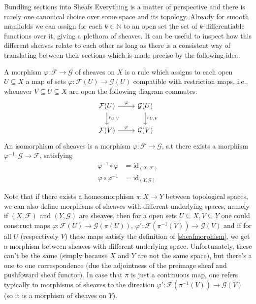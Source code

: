 \begin{subsection}{Bundling sections into Sheafs}
Everything is a matter of perspective and there is rarely one canonical choice over some space and its 
topology. Already for smooth manifolds we can assign for each \( k \in \mathbb{N} \) to an open set
the set of \( k \)-differentiable functions over it, giving a plethora of sheaves. It can be useful to inspect
how this different sheaves relate to each other as long as there is a consistent way of translating between their sections
which is made precise by the following idea.
\begin{definition} \label{sheafmorphism}
    A morphism \(\varphi : \mathcal{F} \to \mathcal{G}\) of sheaves on \(X\) is a rule which assigns to each open \(U \subseteq X\) 
    a map of sets \(\varphi : \mathcal{F}(U) \to \mathcal{G}(U)\) compatible with restriction maps, i.e., whenever \(V \subseteq U \subseteq X\) are open 
    the following diagram commutes: 
    \[
        \begin{tikzcd}
            \mathcal{F}(U) \arrow[r, "\varphi"] \arrow[d, "r_{U,V}"] & \mathcal{G}(U) \arrow[d, "r_{U,V}"] \\
            \mathcal{F}(V) \arrow[r, "\varphi"] & \mathcal{G}(V)
        \end{tikzcd}
    \]
    An isomorphism of sheaves is a morphism \( \varphi : \mathcal{F} \to \mathcal{G} \), s.t there exists a morphism 
    \( \varphi^{-1} : \mathcal{G} \to \mathcal{F} \), satisfying 
    \begin{align*}
        \varphi^{-1} \circ \varphi &= \text{id}_{(X, \mathcal{F})} \\
    \varphi \circ \varphi^{-1} &= \text{id}_{(Y, \mathcal{G})} 
    \end{align*}
\end{definition}
Note that if there exists a homeomorphism \( \pi : X \to Y \) between topological spaces, we can
also define morphisms of sheaves with different underlying spaces, namely if \( (X, \mathcal{F}) \) and \( (Y, \mathcal{G}) \)
are sheaves, then for a open sets \( U \subseteq X, V \subseteq Y \) one could construct maps 
\( \varphi : \mathcal{F}(U) \to \mathcal{G}(\pi(U)) \), \( \varphi' : \mathcal{F}(\pi^{-1}(V)) \to \mathcal{G}(V)  \)
and if for all \( U \) (respectively \( V \)) these maps satisfy the definition of \ref{sheafmorphism},
we get a morphism between sheaves with different underlying space. Unfortunately, these can't be the same
(simply because \( X \) and \( Y \) are not the same space), but there's a one to one correspondence
(due the adjointness of the preimage sheaf and pushfoward sheaf functor). In case that \( \pi \)
is just a continuous map, one refers typically to morphisms of sheaves to the direction \( \varphi' : \mathcal{F}(\pi^{-1}(V)) \to \mathcal{G}(V) \) 
(so it is a morphism of sheaves on \( Y \)).

\end{subsection}
